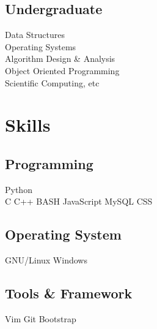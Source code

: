 \documentclass[]{deedy-resume-openfont}
\begin{document}
\begin{minipage}[t]{0.33\textwidth}


\subsection{Undergraduate}
Data Structures \\
Operating Systems \\
Algorithm Design \& Analysis \\
Object Oriented Programming \\
Scientific Computing, etc \\
\sectionsep


\section{Skills}
\subsection{Programming}
\textbullet{} Python \\
\textbullet{} C \textbullet{} C++ \textbullet{} BASH
\textbullet{} JavaScript \textbullet{} MySQL \textbullet{} CSS
\subsection{Operating System}
\textbullet{} GNU/Linux \textbullet{} Windows
\subsection{Tools \& Framework}
\textbullet Vim \textbullet{} Git \textbullet{} Bootstrap
\sectionsep


\end{minipage}
\end{document}
